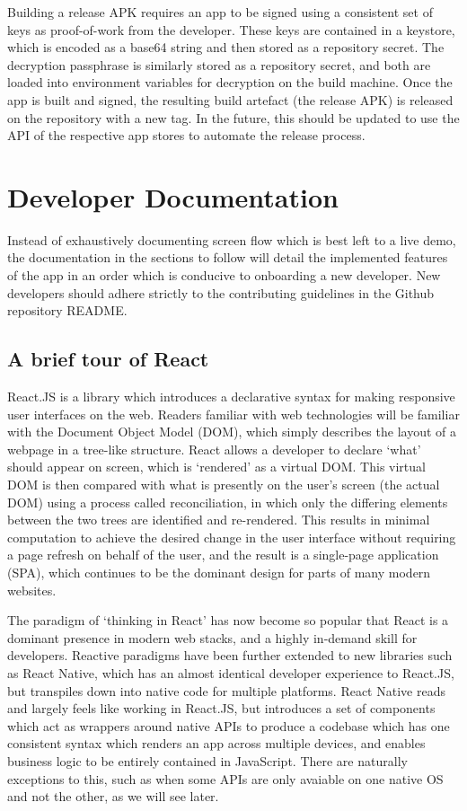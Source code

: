 Building a release APK requires an app to be signed using a consistent set of keys as proof-of-work from the developer. These keys are contained in a keystore, which is encoded as a base64 string and then stored as a repository secret. The decryption passphrase is similarly stored as a repository secret, and both are loaded into environment variables for decryption on the build machine. Once the app is built and signed, the resulting build artefact (the release APK) is released on the repository with a new tag. In the future, this should be updated to use the API of the respective app stores to automate the release process.


\section{Developer Documentation}
Instead of exhaustively documenting screen flow which is best left to a live demo, the documentation in the sections to follow will detail the implemented features of the app in an order which is conducive to onboarding a new developer. New developers should adhere strictly to the contributing guidelines in the Github repository README.

\subsection{A brief tour of React}
React.JS is a library which introduces a declarative syntax for making responsive user interfaces on the web. Readers familiar with web technologies will be familiar with the Document Object Model (DOM), which simply describes the layout of a webpage in a tree-like structure. React allows a developer to declare `what' should appear on screen, which is `rendered' as a virtual DOM. This virtual DOM is then compared with what is presently on the user's screen (the actual DOM) using a process called reconciliation, in which only the differing elements between the two trees are identified and re-rendered. This results in minimal computation to achieve the desired change in the user interface without requiring a page refresh on behalf of the user, and the result is a single-page application (SPA), which continues to be the dominant design for parts of many modern websites.

The paradigm of `thinking in React' has now become so popular that React is a dominant presence in modern web stacks, and a highly in-demand skill for developers. Reactive paradigms have been further extended to new libraries such as React Native, which has an almost identical developer experience to React.JS, but transpiles down into native code for multiple platforms. React Native reads and largely feels like working in React.JS, but introduces a set of components which act as wrappers around native APIs to produce a codebase which has one consistent syntax which renders an app across multiple devices, and enables business logic to be entirely contained in JavaScript. There are naturally exceptions to this, such as when some APIs are only avaiable on one native OS and not the other, as we will see later.

